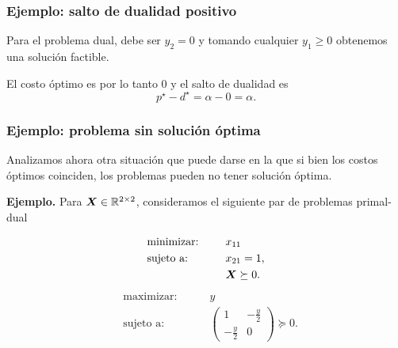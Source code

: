 \documentclass[aspectratio=169,12pt,spanish]{beamer}
\begin{document}

\begin{frame}
\frametitle{Ejemplo: salto de dualidad positivo}

Para el problema dual, debe ser $y_2 = 0$ y tomando cualquier $y_1 \ge 0$ obtenemos una solución factible.

El costo óptimo es por lo tanto 0 y el salto de dualidad es
$$p^\star - d^\star = \alpha - 0 = \alpha.$$


\end{frame}


\begin{frame}
\frametitle{Ejemplo: problema sin solución óptima}

Analizamos ahora otra situación que puede darse en la que si bien los costos óptimos coinciden, los problemas pueden no tener solución óptima.

\textbf{Ejemplo.}
Para $\bm{X} \in \mathbb{R}^{2 \times 2}$, consideramos el siguiente par de problemas primal-dual
\begin{multicols}{2}\noindent
\begin{alignat*}{2}
  & \text{minimizar: }  & \quad & x_{11}   \\
   & \text{sujeto a: } & \quad & x_{21} = 1, \\
   &&& \Xb \succeq 0.
\end{alignat*}
\begin{alignat*}{2}
  & \text{maximizar: }  & \quad & y   \\
   & \text{sujeto a: } & \quad & \begin{pmatrix}
 1 & -\frac{y}{2}  \\ -\frac{y}{2} & 0 \end{pmatrix} \succeq 0.
\end{alignat*}
\end{multicols}


\end{frame}

\end{document}
